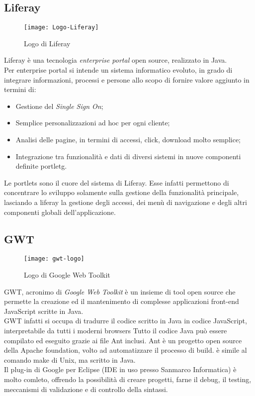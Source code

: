\subsection{Liferay}
\begin{figure}[h]
	\centering
	\texttt{[image: Logo-Liferay]}
	\caption{Logo di Liferay}
\end{figure}
Liferay è una tecnologia \emph{enterprise portal} open source, realizzato in Java.\\
Per enterprise portal si intende un sistema informatico evoluto, in grado di integrare informazioni, processi e persone allo scopo di fornire valore aggiunto in termini di:
\begin{itemize}
	\item Gestione del \emph{Single Sign On};
	\item Semplice personalizzazioni ad hoc per ogni cliente;
	\item Analisi delle pagine, in termini di accessi, click, download molto semplice;
	\item Integrazione tra funzionalità e dati di diversi sistemi in nuove componenti definite \gls{portletg}. 
\end{itemize}
Le portlets sono il cuore del sistema di Liferay. Esse infatti permettono di concentrare lo sviluppo solamente sulla gestione della funzionalità principale, lasciando a liferay la gestione degli accessi, dei menù di navigazione e degli altri componenti globali dell'applicazione.\\
\subsection{GWT}
\begin{figure}[h]
	\centering
	\texttt{[image: gwt-logo]}
	\caption{Logo di Google Web Toolkit}
\end{figure} 
GWT, acronimo di \emph{Google Web Toolkit} è un insieme di tool open source che permette la creazione ed il mantenimento di complesse applicazioni front-end JavaScript scritte in Java.\\
GWT infatti si occupa di tradurre il codice scritto in Java in codice JavaScript, interpretabile da tutti i moderni browsers Tutto il codice Java può essere compilato ed eseguito grazie ai file Ant inclusi.
Ant è un progetto open source della Apache foundation, volto ad automatizzare il processo di build. è simile al comando make di Unix, ma scritto in Java. \\ %
Il plug-in di Google per Eclipse (IDE in uso presso Sanmarco Informatica) è molto comleto, offrendo la possibilità di creare progetti, farne il debug, il testing, meccanismi di validazione e di controllo della sintassi.\\
